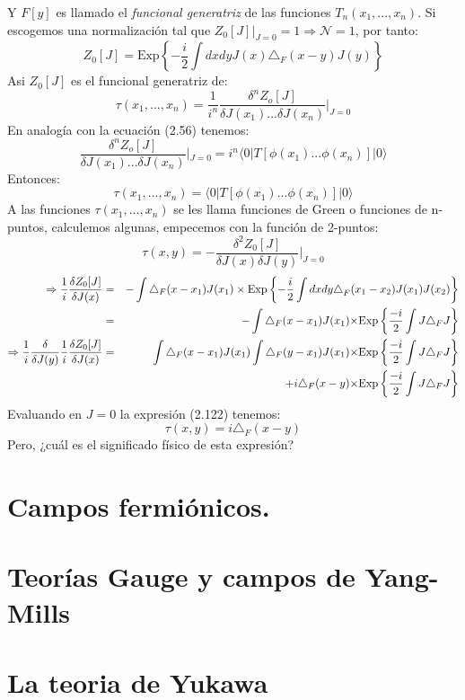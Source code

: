 Y $F[y]$ es llamado el \textit{funcional generatriz} de las funciones  $T_{n}(x_{1},...,x_{n})$. Si escogemos una normalización tal que $Z_0[J]|_{J=0}=1 \Rightarrow \mathcal{N}=1$, por tanto:
\begin{equation}
Z_{0}[J]=\text{Exp}\left\{ -\frac{i}{2}\int dxdyJ(x)\triangle_{F}(x-y)J(y)\right\} 
\end{equation}
Asi $Z_0[J]$ es el funcional generatriz de:
\begin{equation}
\tau(x_{1},...,x_{n})=\frac{1}{i^{n}}\frac{\delta^{n}Z_{o}[J]}{\delta J(x_{1})...\delta J(x_{n})}|_{J=0}
\end{equation}
En analogía con la ecuación (2.56) tenemos:
\begin{equation}
\frac{\delta^{n}Z_{o}[J]}{\delta J(x_{1})...\delta J(x_{n})}|_{J=0}=i^{n}\langle0|T[\phi(x_{1})...\phi(x_{n})]|0\rangle
\end{equation}
Entonces:
\begin{equation}
\tau(x_1,...,x_n)=\langle0|T[\phi(x_{1})...\phi(x_{n})]|0\rangle
\end{equation}
A las funciones $\tau(x_1,...,x_n)$ se les llama funciones de Green o funciones de n-puntos, calculemos algunas, empecemos con la función de 2-puntos:
\begin{equation}
\tau(x,y)=-\frac{\delta^2Z_0[J]}{\delta J(x)\delta J(y)}|_{J=0}
\end{equation}
\begin{eqnarray}
\nonumber \Rightarrow \frac{1}{i}\frac{\delta Z_{0}[J]}{\delta J(x)}&=&-\int\triangle_{F}(x-x_{1})J(x_{1})\times\text{Exp}\left\{ -\frac{i}{2}\int dxdy\text{\ensuremath{\triangle}}_{F}(x_{1}-x_{2})J(x_{1})J(x_{2})\right\}\\
\nonumber &=& -\int\triangle_{F}(x-x_{1})J(x_{1})\text{\ensuremath{\times}Exp}\left\{ \frac{-i}{2}\int J\triangle_{F}J\right\}\\ 
\nonumber \Rightarrow \frac{1}{i}\frac{\delta}{\delta J(y)}\frac{1}{i}\frac{\delta Z_{0}[J]}{\delta J(x)}&=&\int\triangle_{F}(x-x_{1})J(x_{1})\int\triangle_{F}(y-x_{1})J(x_{1})\text{\ensuremath{\times}Exp}\left\{ \frac{-i}{2}\int J\triangle_{F}J\right\}\\
&&+ i\triangle_{F}(x-y)\text{\ensuremath{\times}Exp}\left\{ \frac{-i}{2}\int J\triangle_{F}J\right\}\\
\end{eqnarray}
Evaluando en $J=0$ la expresión (2.122) tenemos:
\begin{equation}
\tau(x,y)=i\triangle_F(x-y)
\end{equation}
Pero, ¿cuál es el significado físico de esta expresión?           






\section{Campos fermiónicos.}
\section{Teorías Gauge y campos de Yang-Mills}
\section{La teoria de Yukawa}